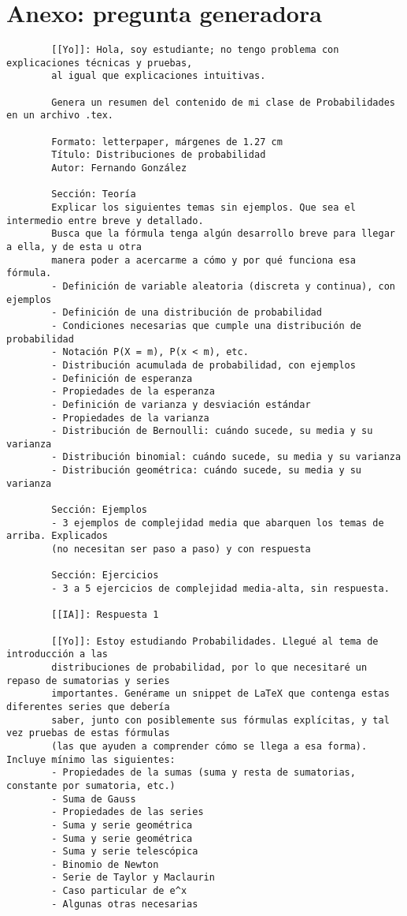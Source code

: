 \documentclass[letterpaper, 12pt]{article}
\begin{document}
	\section*{Anexo: pregunta generadora}
	\begin{verbatim}
		[[Yo]]: Hola, soy estudiante; no tengo problema con explicaciones técnicas y pruebas,
		al igual que explicaciones intuitivas.
		
		Genera un resumen del contenido de mi clase de Probabilidades en un archivo .tex.
		
		Formato: letterpaper, márgenes de 1.27 cm
		Título: Distribuciones de probabilidad
		Autor: Fernando González
		
		Sección: Teoría
		Explicar los siguientes temas sin ejemplos. Que sea el intermedio entre breve y detallado.
		Busca que la fórmula tenga algún desarrollo breve para llegar a ella, y de esta u otra
		manera poder a acercarme a cómo y por qué funciona esa fórmula.
		- Definición de variable aleatoria (discreta y continua), con ejemplos
		- Definición de una distribución de probabilidad
		- Condiciones necesarias que cumple una distribución de probabilidad
		- Notación P(X = m), P(x < m), etc.
		- Distribución acumulada de probabilidad, con ejemplos
		- Definición de esperanza
		- Propiedades de la esperanza
		- Definición de varianza y desviación estándar
		- Propiedades de la varianza
		- Distribución de Bernoulli: cuándo sucede, su media y su varianza
		- Distribución binomial: cuándo sucede, su media y su varianza
		- Distribución geométrica: cuándo sucede, su media y su varianza
		
		Sección: Ejemplos
		- 3 ejemplos de complejidad media que abarquen los temas de arriba. Explicados
		(no necesitan ser paso a paso) y con respuesta
		
		Sección: Ejercicios
		- 3 a 5 ejercicios de complejidad media-alta, sin respuesta.
		
		[[IA]]: Respuesta 1
		
		[[Yo]]: Estoy estudiando Probabilidades. Llegué al tema de introducción a las
		distribuciones de probabilidad, por lo que necesitaré un repaso de sumatorias y series
		importantes. Genérame un snippet de LaTeX que contenga estas diferentes series que debería
		saber, junto con posiblemente sus fórmulas explícitas, y tal vez pruebas de estas fórmulas
		(las que ayuden a comprender cómo se llega a esa forma). Incluye mínimo las siguientes:
		- Propiedades de la sumas (suma y resta de sumatorias, constante por sumatoria, etc.)
		- Suma de Gauss
		- Propiedades de las series
		- Suma y serie geométrica
		- Suma y serie geométrica
		- Suma y serie telescópica
		- Binomio de Newton
		- Serie de Taylor y Maclaurin
		- Caso particular de e^x
		- Algunas otras necesarias
		

\end{verbatim}
\end{document}
